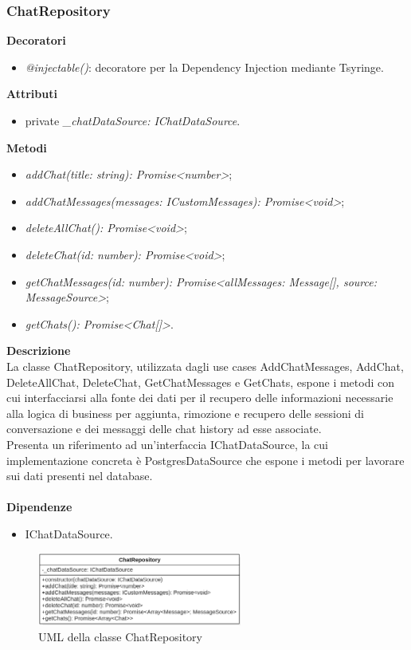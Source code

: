 \newpage

\subsubsection{ChatRepository}
\textbf{Decoratori}
\begin{itemize}
    \item \textit{@injectable()}: decoratore per la Dependency Injection mediante Tsyringe.
\end{itemize}
\textbf{Attributi}
\begin{itemize}
    \item private \textit{\_chatDataSource: IChatDataSource}.
\end{itemize}
\textbf{Metodi}
\begin{itemize}[itemsep=-4pt]
    \item \textit{addChat(title: string): Promise<number>};
    \item \textit{addChatMessages(messages: ICustomMessages): Promise<void>};
    \item \textit{deleteAllChat(): Promise<void>};
    \item \textit{deleteChat(id: number): Promise<void>};
    \item \textit{getChatMessages(id: number): Promise<allMessages: Message[], source: MessageSource>};
    \item \textit{getChats(): Promise<Chat[]>}.
\end{itemize}
\textbf{Descrizione}\\
La classe ChatRepository, utilizzata dagli use cases AddChatMessages, AddChat, DeleteAllChat, DeleteChat, GetChatMessages e GetChats, espone i metodi con cui interfacciarsi alla fonte dei dati per il recupero delle informazioni necessarie alla logica di business per aggiunta, rimozione e recupero delle sessioni di conversazione e dei messaggi delle chat history ad esse associate.\\
Presenta un riferimento ad un'interfaccia IChatDataSource, la cui implementazione concreta è PostgresDataSource che espone i metodi per lavorare sui dati presenti nel database.\\ \\
\textbf{Dipendenze}
\begin{itemize}
    \item IChatDataSource.
\end{itemize}

\begin{figure}[h!]
    \centering  
    \includegraphics[width=0.6\textwidth]{ChatRepository.png}
    \caption{UML della classe ChatRepository}
\end{figure}
